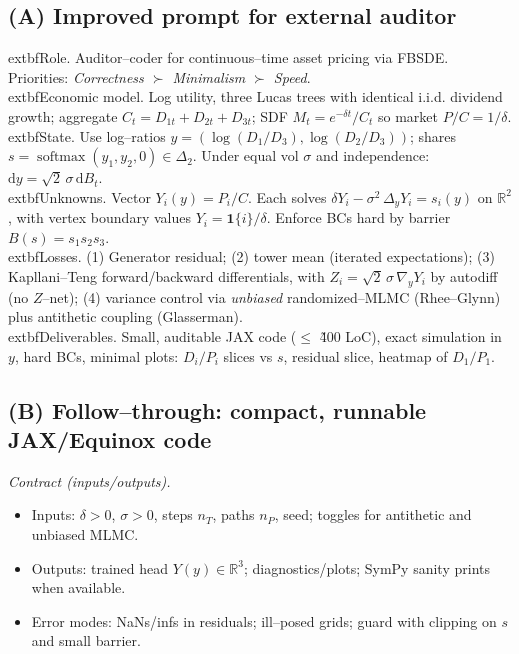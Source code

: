 ﻿\documentclass[11pt,letterpaper,oneside]{article}
\numberwithin{equation}{section}
\newcommand{\ac}[1]{{\mdseries\textsc{#1}}}
\newcommand{\R}{\mathbb{R}}
\newcommand{\1}{\mathbf{1}}
\newcommand{\diff}{\mathrm{d}}
\begin{document}
\subsection{(A) Improved prompt for external auditor}
\begin{tcolorbox}[mathstyle,title={Copy/paste prompt (abridged for this note)}]
\small
	extbf{Role.} Auditor--coder for continuous--time asset pricing via \ac{FBSDE}. Priorities: \emph{Correctness $\succ$ Minimalism $\succ$ Speed}.\\
	extbf{Economic model.} Log utility, three Lucas trees with identical i.i.d. dividend growth; aggregate $C_t=D_{1t}+D_{2t}+D_{3t}$; SDF $M_t=e^{-\delta t}/C_t$ so market $P/C=1/\delta$.\\
	extbf{State.} Use log--ratios $y=(\log(D_1/D_3),\log(D_2/D_3))$; shares $s=\operatorname{softmax}(y_1,y_2,0)\in\Delta_2$. Under equal vol $\sigma$ and independence: $\diff y=\sqrt{2}\,\sigma\,\diff B_t$.\\
	extbf{Unknowns.} Vector $Y_i(y)=P_i/C$. Each solves $\delta Y_i-\sigma^2\,\Delta_y Y_i=s_i(y)$ on $\R^2$, with vertex boundary values $Y_i=\1\{i\}/\delta$. Enforce BCs hard by barrier $B(s)=s_1s_2s_3$.\\
	extbf{Losses.} (1) Generator residual; (2) tower mean (iterated expectations); (3) Kapllani--Teng forward/backward differentials, with $Z_i=\sqrt{2}\,\sigma\,\nabla_y Y_i$ by autodiff (no $Z$--net); (4) variance control via \emph{unbiased} randomized--MLMC (Rhee--Glynn) plus antithetic coupling (Glasserman).\\
	extbf{Deliverables.} Small, auditable JAX code (\(\le\)\,\,\~400 LoC), exact simulation in $y$, hard BCs, minimal plots: $D_i/P_i$ slices vs $s$, residual slice, heatmap of $D_1/P_1$.
\end{tcolorbox}

\subsection{(B) Follow--through: compact, runnable JAX/Equinox code}
\noindent\emph{Contract (inputs/outputs).}
\begin{itemize}[leftmargin=1.25em]
  \item Inputs: $\delta>0$, $\sigma>0$, steps $n_T$, paths $n_P$, seed; toggles for antithetic and unbiased MLMC.
  \item Outputs: trained head $Y(y)\in\R^3$; diagnostics/plots; SymPy sanity prints when available.
  \item Error modes: NaNs/infs in residuals; ill--posed grids; guard with clipping on $s$ and small barrier.
\end{itemize}
\end{document}

